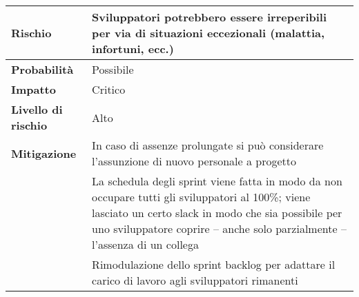 \begin{table}[H]
  \begin{tabularx}{\textwidth}{lX}
    \toprule
    \textbf{Rischio}            & \textbf{Sviluppatori potrebbero essere irreperibili per via di situazioni eccezionali (malattia, infortuni, ecc.)}                                                                                                                       \\
    \midrule
    \textbf{Probabilità}        & Possibile                                                                                                                                                                                                                                \\
    \textbf{Impatto}            & Critico                                                                                                                                                                                                                                  \\
    \textbf{Livello di rischio} & Alto                                                                                                                                                                                                                                     \\
    \textbf{Mitigazione}        & In caso di assenze prolungate si può considerare l'assunzione di nuovo personale a progetto                                                                                                                                              \\
                                & La schedula degli sprint viene fatta in modo da non occupare tutti gli sviluppatori al 100\%; viene lasciato un certo slack in modo che sia possibile per uno sviluppatore coprire -- anche solo parzialmente -- l'assenza di un collega \\
                                & Rimodulazione dello sprint backlog per adattare il carico di lavoro agli sviluppatori rimanenti                                                                                                                                          \\
    \bottomrule
  \end{tabularx}
\end{table}
